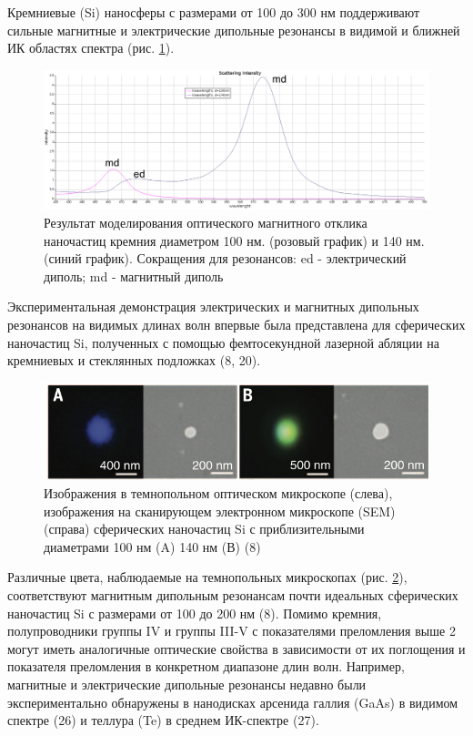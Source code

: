 Кремниевые (Si) наносферы с размерами от 100 до 300 нм поддерживают сильные магнитные и электрические дипольные резонансы в видимой и ближней ИК областях спектра (рис. \ref{fig2}). 
 \begin{figure}[h!]
	\centering
	\includegraphics[width=0.7\linewidth]{images/graph1.png}
	\caption{Результат моделирования оптического магнитного отклика наночастиц кремния  диаметром 100 нм. (розовый график) и 140 нм. (синий график).  Сокращения для резонансов: ed - электрический диполь; md - магнитный диполь}
	\label{fig2}
\end{figure}
Экспериментальная демонстрация электрических и магнитных дипольных резонансов на видимых длинах волн впервые была представлена для сферических наночастиц Si, полученных с помощью фемтосекундной лазерной абляции на кремниевых и стеклянных подложках (8, 20). 
 \begin{figure}[h!]
	\centering
	\includegraphics[width=0.7\linewidth]{images/fig2.png}
	\caption{ Изображения в темнопольном оптическом микроскопе (слева), изображения на сканирующем электронном микроскопе (SEM) (справа)  сферических наночастиц Si с приблизительными диаметрами 100 нм (A) 140 нм (В)  (8)}
	\label{fig3}
\end{figure}
Различные цвета, наблюдаемые на темнопольных микроскопах (рис. \ref{fig3}), соответствуют магнитным дипольным резонансам почти идеальных сферических наночастиц Si с размерами от 100 до 200 нм (8).  Помимо кремния, полупроводники группы IV и группы III-V с показателями преломления выше 2 могут иметь аналогичные оптические свойства в зависимости от их поглощения и показателя преломления в конкретном диапазоне длин волн. Например, магнитные и электрические дипольные резонансы недавно были экспериментально обнаружены в нанодисках арсенида галлия (GaAs) в видимом спектре (26) и теллура (Te) в среднем ИК-спектре (27).



